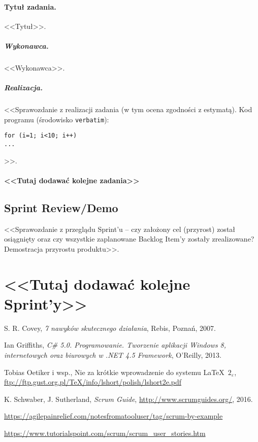 \documentclass[a4paper]{article}
\begin{document}
\paragraph{Tytuł zadania.} <<Tytuł>>.
\subparagraph{Wykonawca.} <<Wykonawca>>.
\subparagraph{Realizacja.} <<Sprawozdanie z realizacji zadania (w tym ocena zgodności z estymatą). Kod programu (środowisko \texttt{verbatim}): \begin{verbatim}
for (i=1; i<10; i++)
...
\end{verbatim}>>.

\paragraph{<<Tutaj dodawać kolejne zadania>>}


\subsection{Sprint Review/Demo}
<<Sprawozdanie z przeglądu Sprint'u -- czy założony cel (przyrost) został osiągnięty oraz czy wszystkie zaplanowane Backlog Item'y zostały zrealizowane? Demostracja przyrostu produktu>>.

\section*{<<Tutaj dodawać kolejne Sprint'y>>}


\begin{thebibliography}{9}

 S. R. Covey, {\em 7 nawyków skutecznego działania}, Rebis, Poznań, 2007.

 Ian Griffiths, {\em C\# 5.0. Programowanie. Tworzenie aplikacji Windows 8, internetowych oraz biurowych w .NET 4.5 Framework}, O’Reilly, 2013.

 Tobias Oetiker i wsp., Nie za krótkie wprowadzenie do systemu \LaTeX  \ $2_\varepsilon$, \url{ftp://ftp.gust.org.pl/TeX/info/lshort/polish/lshort2e.pdf}

 K. Schwaber, J. Sutherland, {\em Scrum Guide}, \url{http://www.scrumguides.org/}, 2016.

 \url{https://agilepainrelief.com/notesfromatooluser/tag/scrum-by-example}

 \url{https://www.tutorialspoint.com/scrum/scrum_user_stories.htm}

\end{thebibliography}
\end{document}
